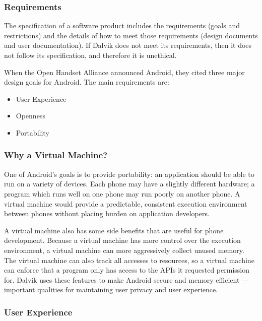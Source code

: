\documentclass[11pt]{article}
\begin{document}
\begin{multicols}{2}
\subsubsection{Requirements} %
\label{ssub:requirements}

The specification of a software product includes the requirements (goals and
restrictions) and the details of how to meet those requirements (design
documents and user documentation).  If Dalvik does not meet its requirements,
then it does not follow its specification, and therefore it is unethical.

When the Open Handset Alliance announced Android, they cited three major
design goals for Android.  The main requirements are: \cite{open-handset-alliance-ann}

\begin{itemize}
    \item User Experience
    \item Openness
    \item Portability
\end{itemize}


\subsubsection{Why a Virtual Machine?} %
\label{ssub:why-vm}

One of Android's goals is to provide portability: an application should be able
to run on a variety of devices.  Each phone may have a slightly different
hardware; a program which runs well on one phone may run poorly on another
phone.  A virtual machine would provide a predictable, consistent execution
environment between phones without placing burden on application developers.

A virtual machine also has some side benefits that are useful for phone
development.  Because a virtual machine has more control over the execution
environment, a virtual machine can more aggressively collect unused memory.  The
virtual machine can also track all accesses to resources, so a virtual machine
can enforce that a program only has access to the APIs it requested permission
for.  Dalvik uses these features to make Android secure and memory efficient ---
important qualities for maintaining user privacy and user experience.


\subsubsection{User Experience} %
\label{ssub:quality}


\end{multicols}
\end{document}
